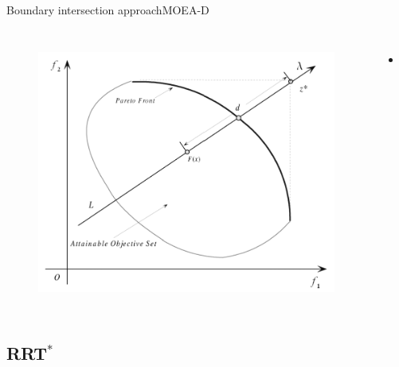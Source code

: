 \begin{frame}{Boundary intersection approach}{MOEA-D}
	\begin{columns}
		\begin{figure}
			\centering
			\includegraphics[width=\linewidth]{figure/boundary_intersection}
			\label{fig:boundary_intersection}
		\end{figure}
		\begin{minipage}{\textwidth}
			\begin{itemize}[leftmargin=*]
				\item 
				\begin{equation}
				\end{equation}
			\end{itemize}
		\end{minipage}
	\end{columns}
\end{frame}

\subsection{RRT$^{*}$}

